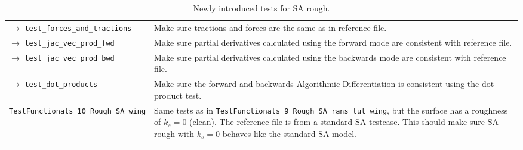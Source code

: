 \begin{xltabular}{\textwidth}{lX}
    $\rightarrow$ \texttt{test\_forces\_and\_tractions} & Make sure tractions and
    forces are the same as in reference file.\\

    $\rightarrow$ \texttt{test\_jac\_vec\_prod\_fwd} & Make sure partial
    derivatives calculated using the forward mode are consistent with reference
    file. \\

    $\rightarrow$ \texttt{test\_jac\_vec\_prod\_bwd} & Make sure partial
    derivatives calculated using the backwards mode are consistent with reference
    file. \\

    $\rightarrow$ \texttt{test\_dot\_products} & Make sure the forward and
    backwards Algorithmic Differentiation is consistent using the dot-product test. \\

    \midrule

    \texttt{TestFunctionals\_10\_Rough\_SA\_wing} & Same tests as in
    \texttt{TestFunctionals\_9\_Rough\_SA\_rans\_tut\_wing}, but the surface has a
    roughness of $k_{s} = 0$ (clean). The reference file is from a standard SA
    testcase. This should make sure SA rough with $k_{s} = 0$ behaves like the
    standard SA model. \\

  \bottomrule

  \caption{Newly introduced tests for SA rough.}
  \label{tab:tests}
\end{xltabular}
\endgroup
